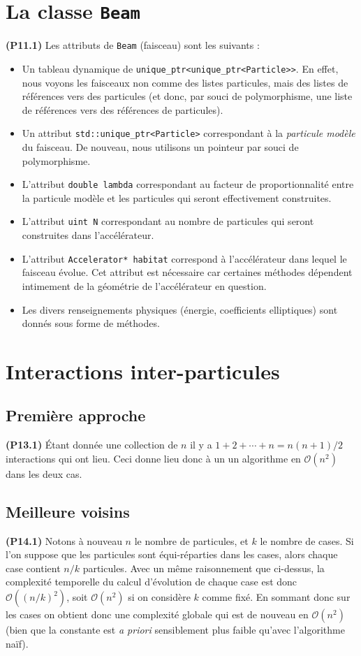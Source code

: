 \documentclass[12pt, letterpaper, twoside]{article}
\newcommand{\T}[1]{\texttt{#1}}
\def\O{\mathcal{O}}
\begin{document}
\section{La classe \T{Beam}}
\noindent \textbf{(P11.1)} Les attributs de \T{Beam} (faisceau) sont les suivants :
\begin{itemize}
	\item Un tableau dynamique de \T{unique\_ptr<unique\_ptr<Particle>>}. En effet, nous voyons les faisceaux non comme des listes particules, mais des listes de références vers des particules (et donc, par souci de polymorphisme, une liste de références vers des références de particules).
	\item Un attribut \T{std::unique\_ptr<Particle>} correspondant à la \textit{particule modèle} du faisceau. De nouveau, nous utilisons un pointeur par souci de polymorphisme.
	\item L'attribut \T{double lambda} correspondant au facteur de proportionnalité entre la particule modèle et les particules qui seront effectivement construites.
	\item L'attribut \T{uint N} correspondant au nombre de particules qui seront construites dans l'accélérateur.
	\item L'attribut \T{Accelerator* habitat} correspond à l'accélérateur dans lequel le faisceau évolue. Cet attribut est nécessaire car certaines méthodes dépendent intimement de la géométrie de l'accélérateur en question.
	\item Les divers renseignements physiques (énergie, coefficients elliptiques) sont donnés sous forme de méthodes.
\end{itemize}

\section{Interactions inter-particules}
\subsection{Première approche}
\noindent \textbf{(P13.1)} Étant donnée une collection de $n$ il y a $1+2+\cdots+n = n(n+1)/2$ interactions qui ont lieu. Ceci donne lieu donc à un un algorithme en $\O(n^2)$ dans les deux cas.

\subsection{Meilleure voisins}
\noindent \textbf{(P14.1)} Notons à nouveau $n$ le nombre de particules, et $k$ le nombre de cases. Si l'on suppose que les particules sont équi-réparties dans les cases, alors chaque case contient $n/k$ particules. Avec un même raisonnement que ci-dessus, la complexité temporelle du calcul d'évolution de chaque case est donc $\O((n/k)^2)$, soit $\O(n^2)$ si on considère $k$ comme fixé. En sommant donc sur les cases on obtient donc une complexité globale qui est de nouveau en $\O(n^2)$ (bien que la constante est \textit{a priori} sensiblement plus faible qu'avec l'algorithme naïf).
\end{document}
